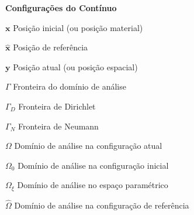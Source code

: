 \documentclass[12pt,
	openright,	%
	twoside,    %
	a4paper,			%
	sumario=tradicional,
	english,			%
	french, 			%
	brazil				%
]{USPSC}
\newcommand{\BB}[1]{\mathbf{#1}}
\begin{document}
\begin{simbolos}
    \item[\textbf{Configurações do Contínuo}]
    \item[$\BB{x}$] Posição inicial (ou posição material)
    \item[$\BB{\hat{x}}$] Posição de referência
    \item[$\BB{y}$] Posição atual (ou posição espacial)
    \item[$\Gamma$] Fronteira do domínio de análise
    \item[$\Gamma_D$] Fronteira de Dirichlet
    \item[$\Gamma_N$] Fronteira de Neumann
    \item[$\Omega$] Domínio de análise na configuração atual
    \item[$\Omega_0$] Domínio de análise na configuração inicial
    \item[$\Omega_\xi$] Domínio de análise no espaço paramétrico
    \item[$\hat{\Omega}$] Domínio de análise na configuração de referência


\end{simbolos}
\end{document}
